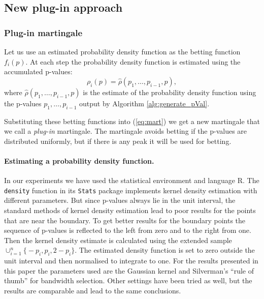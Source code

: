 \documentclass{article}
\theoremstyle{definition}
\begin{document}
\subsection{New plug-in approach}

\subsubsection{Plug-in martingale}
Let us use an estimated probability density function
as the betting function $f_i(p)$.
At each step the probability density function is estimated
using the accumulated p-values:
\begin{equation}\label{eq:rho}
  \rho_i(p) = \widehat{\rho}(p_1,\ldots, p_{i-1},p),
\end{equation}
where $\widehat{\rho}(p_1,\ldots, p_{i-1},p)$
is the estimate of the probability density function
using the p-values $p_1,\ldots, p_{i-1}$ output by Algorithm \ref{alg:generate_pVal}.

Substituting these betting functions into (\ref{eq:mart}) we get a new martingale
that we call a \emph{plug-in} martingale.
The martingale avoids betting if the p-values are distributed uniformly,
but if there is any peak it will be used for betting.

\paragraph{Estimating a probability density function.}
 In our experiments we have used the statistical environment and language R.
 The \texttt{density} function in its \texttt{Stats} package
 implements kernel density estimation with different parameters.
 But since p-values always lie in the unit interval,
 the standard methods of kernel density estimation lead to poor results for the points that are near the boundary.
 To get better results for the boundary points
 the sequence of p-values is reflected to the left from zero and to the right from one.
 Then the kernel density estimate is calculated using the extended sample
 $\cup_{i=1}^n\bigl\{-p_i, p_i, 2 - p_i\bigr\}$.
 The estimated density function is set to zero outside the unit interval and then
 normalised to integrate to one.
 For the results presented in this paper the parameters used are
 the Gaussian kernel and Silverman's ``rule of thumb'' for bandwidth selection.
 Other settings have been tried as well, but the results are comparable and lead
 to the same conclusions.
\end{document}
